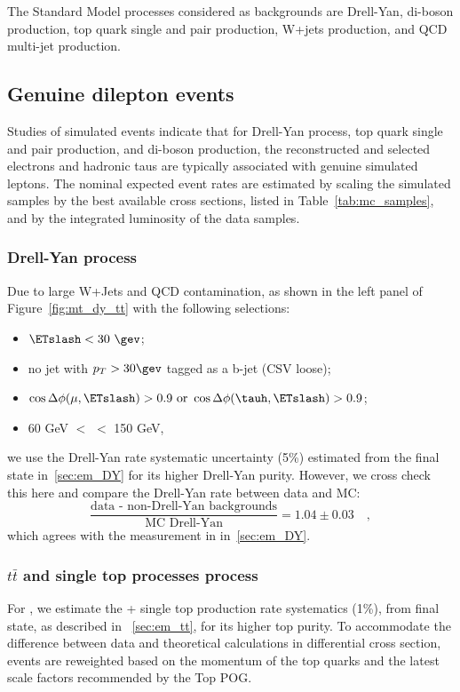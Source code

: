 The Standard Model processes considered as backgrounds are Drell-Yan,
di-boson production, top quark single and pair production, W+jets
production, and QCD multi-jet production.

\subsection{Genuine dilepton events}

Studies of simulated events indicate that for Drell-Yan process, top
quark single and pair production, and di-boson production, the
reconstructed and selected electrons and hadronic taus are typically
associated with genuine simulated leptons.  The nominal expected event
rates are estimated by scaling the simulated samples by the best
available cross sections, listed in Table~\ref{tab:mc_samples}, and by
the integrated luminosity of the data samples.

\subsubsection{Drell-Yan process}
Due to large W+Jets and QCD contamination, as shown in the left panel of 
Figure~\ref{fig:mt_dy_tt} with the following selections:
\begin{itemize}
  \item $\ETslash<30~\gev$;
  \item no jet with $p_T>30\gev$ tagged as a b-jet (CSV loose);
  \item $\cos{\Delta \phi (\mu,\ETslash)} > 0.9~\text{or}~\cos{\Delta \phi (\tauh,\ETslash)} > 0.9$;
  \item 60 GeV $<$ \meffmtau $<$ 150 GeV\quad,
\end{itemize}

we use the Drell-Yan rate systematic uncertainty (5\%) estimated from
the \tetm final state in~\ref{sec:em_DY} for its higher Drell-Yan 
purity. However, we cross check this here and compare the Drell-Yan 
rate between data and MC:
\begin{equation}\label{eq:mt_DY}
\frac{\text{data - non-Drell-Yan backgrounds}}{\text{MC Drell-Yan}} = 1.04 \pm 0.03 \quad,
\end{equation}
which agrees with the measurement in in~\ref{sec:em_DY}.

\subsubsection{$t\bar{t}$ and single top processes process}\label{sec:mt_tt}
For \tmth, we estimate the \ttbar + single top production rate
systematics (1\%), from  \tetm final state, as described in 
~\ref{sec:em_tt}, for its higher top purity.  To accommodate 
the difference between data and theoretical calculations in \ttbar 
differential cross section, \ttbar events are reweighted based 
on the momentum of the top quarks and the latest scale factors 
recommended by the Top POG.

